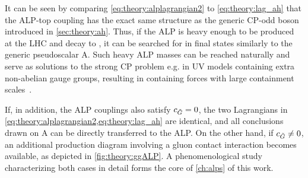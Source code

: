 It can be seen by comparing \cref{eq:theory:alplagrangian2} to \cref{eq:theory:lag_ah} that the ALP-top coupling has the exact same structure as the generic CP-odd boson introduced in \cref{sec:theory:ah}. Thus, if the ALP is heavy enough to be produced at the LHC and decay to \ttbar, it can be searched for in \ttbar final states similarly to the generic pseudoscalar A. Such heavy ALP masses can  be reached naturally and serve as solutions to the strong CP problem e.g. in UV models containing extra non-abelian gauge groups, resulting in containing forces with large containment scales~\cite{Rubakov:1997vp,Holdom:1982ex,Dimopoulos:2016lvn,Gherghetta:2016fhp}.

If, in addition, the ALP couplings also satisfy $c_{\tilde{G}} = 0$, the two Lagrangians in \cref{eq:theory:alplagrangian2,eq:theory:lag_ah} are identical, and all conclusions drawn on A can be directly transferred to the ALP. On the other hand, if $c_{\tilde{G}} \neq 0$, an additional production diagram involving a gluon contact interaction becomes available, as depicted in \cref{fig:theory:ggALP}. A phenomenological study characterizing both cases in detail forms the core of \cref{ch:alps} of this work.

